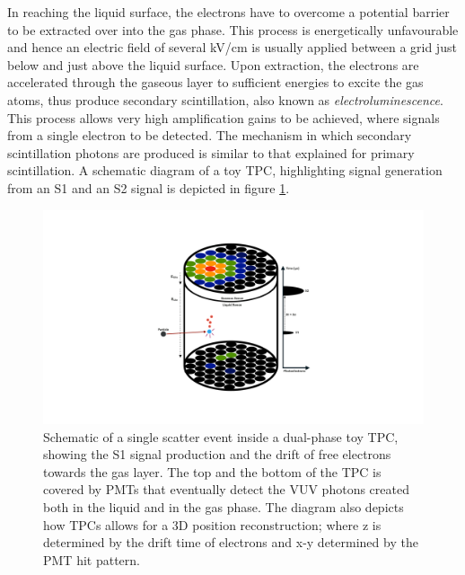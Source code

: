 In reaching the liquid surface, the electrons have to overcome a potential barrier to be extracted over into the gas phase. This process is energetically unfavourable and hence an electric field of several kV/cm is usually applied between a grid just below and just above the liquid surface. Upon extraction, the electrons are accelerated through the gaseous layer to sufficient energies to excite the gas atoms, thus produce secondary scintillation, also known as \textit{electroluminescence}. This process allows very high amplification gains to be achieved, where signals from a single electron to be detected. The mechanism in which secondary scintillation photons are produced is similar to that explained for primary scintillation. A schematic diagram of a toy TPC, highlighting signal generation from an S1 and an S2 signal is depicted in figure \ref{fig:tpc_diagram_cad}. 
%
\begin{figure}[hb!]
    \begin{center}
        \includegraphics[scale=0.30]{Chapter_2/Figures/TPC_Diagram.pdf}
        \caption[Schematic of a single scatter event inside a dual-phase toy TPC, showing the S1 signal production and the drift of free electrons towards the gas layer]%
        {Schematic of a single scatter event inside a dual-phase toy TPC, showing the S1 signal production and the drift of free electrons towards the gas layer. The top and the bottom of the TPC is covered by PMTs that eventually detect the VUV photons created both in the liquid and in the gas phase. The diagram also depicts how TPCs allows for a 3D position reconstruction; where z is determined by the drift time of electrons and x-y determined by the PMT hit pattern.}
        \label{fig:tpc_diagram_cad}
        \end{center}
\end{figure}
%


